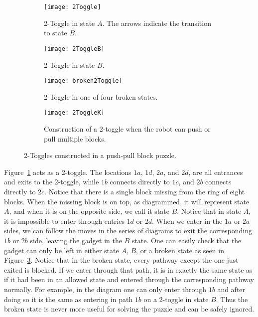 \begin{figure}[!ht]
\centering
\begin{subfigure}[t]{0.45\textwidth}
  \centering
    \texttt{[image: 2Toggle]}
    \caption{2-Toggle in state $A$. The arrows indicate the transition to state $B$.}
    \label{fig:2toggleA}
\end{subfigure}
\begin{subfigure}[t]{0.45\textwidth}
  \centering
    \texttt{[image: 2ToggleB]}
    \caption{2-Toggle in state $B$.}
    \label{fig:2toggleB}
\end{subfigure}
    \begin{subfigure}[t]{0.45\textwidth}
  \centering
    \texttt{[image: broken2Toggle]}
    \caption{2-Toggle in one of four broken states.}
    \label{fig:broken2toggle}
    \end{subfigure}
  \begin{subfigure}[t]{.45\textwidth}
  \centering
    \texttt{[image: 2ToggleK]}
    \caption{Construction of a 2-toggle when the robot can push or pull multiple blocks.}
    \label{fig:2ToggleK}
    \end{subfigure}
    \caption{2-Toggles constructed in a push-pull block puzzle.}
\end{figure}

Figure~\ref{fig:2toggleA} acts as a 2-toggle. The locations $1a$, $1d$, $2a$, and $2d$, are all entrances and exits to the 2-toggle, while $1b$ connects directly to $1c$, and $2b$ connects directly to $2c$. Notice that there is a single block missing from the ring of eight blocks. When the missing block is on top, as diagrammed, it will represent state $A$, and when it is on the opposite side, we call it state $B$. Notice that in state $A$, it is impossible to enter through entries $1d$ or $2d$. When we enter in the $1a$ or $2a$ sides, we can follow the moves in the series of diagrams to exit the corresponding $1b$ or $2b$ side, leaving the gadget in the $B$ state. One can easily check that the gadget can only be left in either state $A$, $B$, or a broken state as seen in Figure~\ref{fig:broken2toggle}. Notice that in the broken state, every pathway except the one just exited is blocked. If we enter through that path, it is in exactly the same state as if it had been in an allowed state and entered through the corresponding pathway normally. For example, in the diagram one can only enter through $1b$ and after doing so it is the same as entering in path $1b$ on a 2-toggle in state $B$. Thus the broken state is never more useful for solving the puzzle and can be safely ignored.

